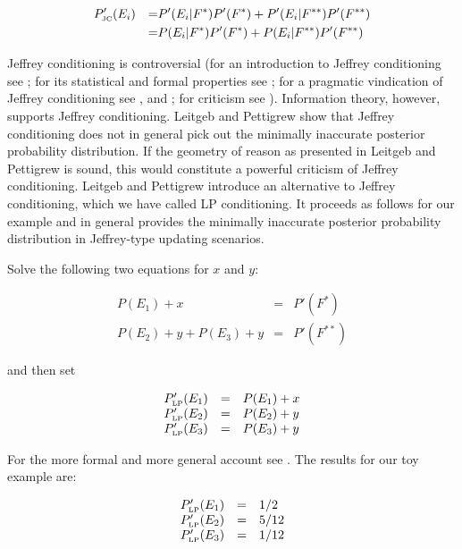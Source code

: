 \documentclass[11pt]{article}
\begin{document}
\begin{align}
  \label{eq:jc}
  &P'_{\mbox{\tiny JC}}(E_{i})&=&P'(E_{i}|F^{*})P'(F^{*})+P'(E_{i}|F^{**})P'(F^{**})\notag \\
  &&=&P(E_{i}|F^{*})P'(F^{*})+P(E_{i}|F^{**})P'(F^{**})
\end{align}

Jeffrey conditioning is controversial (for an introduction to Jeffrey
conditioning see ; for its statistical and
formal properties see ; for a pragmatic
vindication of Jeffrey conditioning see , and
; for criticism see
). Information theory, however, supports
Jeffrey conditioning. Leitgeb and Pettigrew show that Jeffrey
conditioning does not in general pick out the minimally inaccurate
posterior probability distribution. If the geometry of reason as
presented in Leitgeb and Pettigrew is sound, this would constitute a
powerful criticism of Jeffrey conditioning. Leitgeb and Pettigrew
introduce an alternative to Jeffrey conditioning, which we have called
LP conditioning. It proceeds as follows for our example and in general
provides the minimally inaccurate posterior probability distribution
in Jeffrey-type updating scenarios.

Solve the following two equations for $x$ and $y$:

\begin{equation}
  \label{eq:lpce}
  \begin{array}{rcl}
    P(E_{1})+x&=&P'(F^{*}) \\
    P(E_{2})+y+P(E_{3})+y&=&P'(F^{**})
  \end{array}
\end{equation}

and then set

\begin{equation}
  \label{eq:lpcf}
  \begin{array}{rcl}
    P'_{\mbox{\tiny LP}}(E_{1})&=&P(E_{1})+x \\
    P'_{\mbox{\tiny LP}}(E_{2})&=&P(E_{2})+y \\
    P'_{\mbox{\tiny LP}}(E_{3})&=&P(E_{3})+y
  \end{array}
\end{equation}

For the more formal and more general account see
. The results for our toy example
are:

\begin{equation}
  \label{eq:lpcres}
  \begin{array}{rcl}
    P'_{\mbox{\tiny LP}}(E_{1})&=&1/2 \\
    P'_{\mbox{\tiny LP}}(E_{2})&=&5/12 \\
    P'_{\mbox{\tiny LP}}(E_{3})&=&1/12
  \end{array}
\end{equation}
\end{document}
